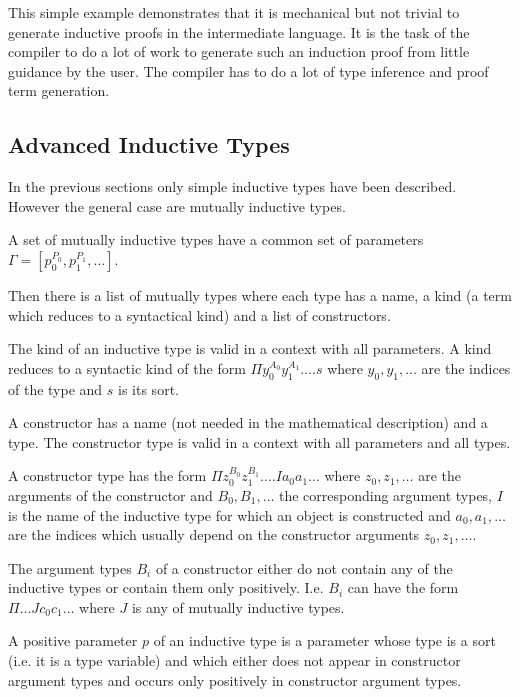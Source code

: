 This simple example demonstrates that it is mechanical but not trivial to
generate inductive proofs in the intermediate language. It is the task of the
compiler to do a lot of work to generate such an induction proof from little
guidance by the user. The compiler has to do a lot of type inference and proof
term generation.







\subsection{Advanced Inductive Types}
\label{sec:advanced-inductive-types}

In the previous sections only simple inductive types have been described.
However the general case are mutually inductive types.

A set of mutually inductive types have a common set of parameters $\Gamma =
[p_0^{P_0}, p_1^{P_1}, \ldots]$.

Then there is a list of mutually types where each type has a name, a kind (a term
which reduces to a syntactical kind) and a list of constructors.

The kind of an inductive type is valid in a context with all parameters. A kind
reduces to a syntactic kind of the form $\Pi y_0^{A_0} y_1^{A_1} \ldots. s$
where $y_0, y_1, \ldots$ are the indices of the type and $s$ is its sort.

A constructor has a name (not needed in the mathematical description) and a
type. The constructor type is valid in a context with all parameters and all
types.

A constructor type has the form $\Pi z_0^{B_0} z_1^{B_1} \ldots . I a_0 a_1
\ldots$ where $z_0, z_1, \ldots$ are the arguments of the constructor and $B_0,
B_1, \ldots$ the corresponding argument types, $I$ is the name of the inductive
type for which an object is constructed and $a_0, a_1, \ldots$ are the indices
which usually depend on the constructor arguments $z_0, z_1, \ldots$.

The argument types $B_i$ of a constructor either do not contain any of the
inductive types or contain them only positively. I.e. $B_i$ can have the form
$\Pi \ldots J c_0 c_1 \ldots$ where $J$ is any of mutually inductive types.

A positive parameter $p$ of an inductive type is a parameter whose type is a
sort (i.e. it is a type variable) and which either does not appear in
constructor argument types and occurs only positively in constructor argument
types.

